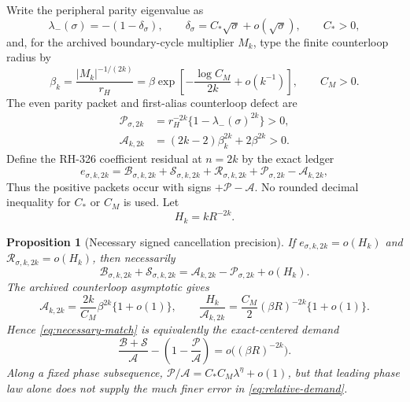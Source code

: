 \documentclass[11pt]{article}
\newtheorem{proposition}[theorem]{Proposition}
\theoremstyle{remark}
\newcommand{\cA}{\mathcal A}
\newcommand{\cB}{\mathcal B}
\newcommand{\cP}{\mathcal P}
\newcommand{\cR}{\mathcal R}
\newcommand{\cS}{\mathcal S}
\begin{document}
Write the peripheral parity eigenvalue as
\begin{equation}
 \lambda_-(\sigma)=-(1-\delta_\sigma),
 \qquad
 \delta_\sigma=C_*\sqrt\sigma+o(\sqrt\sigma),
 \qquad C_*>0,
 \label{eq:parity-type}
\end{equation}
and, for the archived boundary-cycle multiplier $M_k$, type the finite
counterloop radius by
\begin{equation}
 \beta_k=\frac{|M_k|^{-1/(2k)}}{r_H}
 =\beta\exp\left[-\frac{\log C_M}{2k}+o(k^{-1})\right],
 \qquad C_M>0.
 \label{eq:counterloop-type}
\end{equation}
The even parity packet and first-alias counterloop defect are
\begin{align}
 \cP_{\sigma,2k}
 &=r_H^{-2k}\{1-\lambda_-(\sigma)^{2k}\}>0,
 \label{eq:parity-packet}\\
 \cA_{k,2k}
 &=(2k-2)\beta_k^{2k}+2\beta^{2k}>0.
 \label{eq:alias-defect}
\end{align}
Define the RH-326 coefficient residual at $n=2k$ by the exact ledger
\begin{equation}
 e_{\sigma,k,2k}
 =\cB_{\sigma,k,2k}+\cS_{\sigma,k,2k}
  +\cR_{\sigma,k,2k}+\cP_{\sigma,2k}-\cA_{k,2k},
 \label{eq:joint-ledger}
\end{equation}
Thus the positive packets occur with signs $+\cP-\cA$.  No rounded decimal
inequality for $C_*$ or $C_M$ is used.
Let
\begin{equation}
 H_k=kR^{-2k}.
 \label{eq:target}
\end{equation}

\begin{proposition}[Necessary signed cancellation precision]
\label{prop:necessary-budget}
If $e_{\sigma,k,2k}=o(H_k)$ and
$\cR_{\sigma,k,2k}=o(H_k)$, then necessarily
\begin{equation}
 \cB_{\sigma,k,2k}+\cS_{\sigma,k,2k}
 =\cA_{k,2k}-\cP_{\sigma,2k}+o(H_k).
 \label{eq:necessary-match}
\end{equation}
The archived counterloop asymptotic gives
\begin{equation}
 \cA_{k,2k}=\frac{2k}{C_M}\beta^{2k}\{1+o(1)\},
 \qquad
 \frac{H_k}{\cA_{k,2k}}
 =\frac{C_M}{2}(\beta R)^{-2k}\{1+o(1)\}.
 \label{eq:relative-target}
\end{equation}
Hence \eqref{eq:necessary-match} is equivalently the exact-centered demand
\begin{equation}
 \frac{\cB+\cS}{\cA}
 -\left(1-\frac{\cP}{\cA}\right)
 =o\bigl((\beta R)^{-2k}\bigr).
 \label{eq:relative-demand}
\end{equation}
Along a fixed phase subsequence,
$\cP/\cA=C_*C_M\lambda^\eta+o(1)$, but that leading phase law alone does
not supply the much finer error in \eqref{eq:relative-demand}.
\end{proposition}
\end{document}
